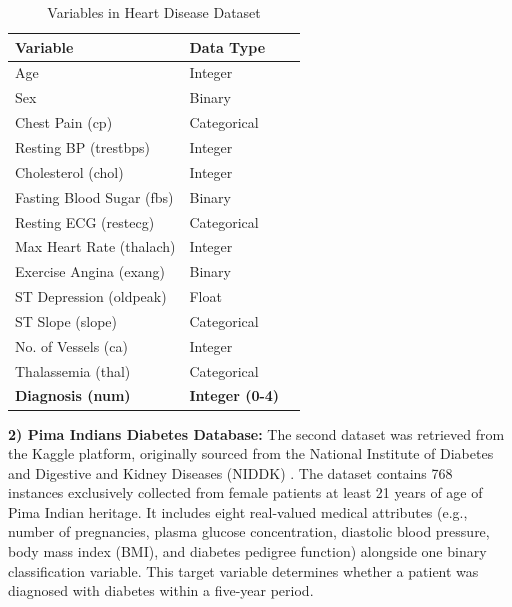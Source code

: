 \documentclass[conference, a4paper]{IEEEtran}
\begin{document}
\begin{table}[htbp]
\caption{Variables in Heart Disease Dataset}
\begin{center}
\begin{tabular}{|l|l|l|}
\hline
\textbf{Variable} & \textbf{Data Type} \\
\hline
Age & Integer \\
Sex & Binary \\
Chest Pain (cp) & Categorical \\
Resting BP (trestbps) & Integer \\
Cholesterol (chol) & Integer \\
Fasting Blood Sugar (fbs) & Binary \\
Resting ECG (restecg) & Categorical \\
Max Heart Rate (thalach)& Integer \\
Exercise Angina (exang) & Binary \\
ST Depression (oldpeak) & Float \\
ST Slope (slope) & Categorical \\
No. of Vessels (ca) & Integer \\
Thalassemia (thal) & Categorical \\
\textbf{Diagnosis (num)} & \textbf{Integer (0-4)} \\
\hline
\end{tabular}
\label{tab:heart_disease}
\end{center}
\end{table}

\textbf{2) Pima Indians Diabetes Database:} The second dataset was retrieved from the Kaggle platform, originally sourced from the National Institute of Diabetes and Digestive and Kidney Diseases (NIDDK) \cite{niddk_pima}. The dataset contains 768 instances exclusively collected from female patients at least 21 years of age of Pima Indian heritage. It includes eight real-valued medical attributes (e.g., number of pregnancies, plasma glucose concentration, diastolic blood pressure, body mass index (BMI), and diabetes pedigree function) alongside one binary classification variable. This target variable determines whether a patient was diagnosed with diabetes within a five-year period.
\end{document}
